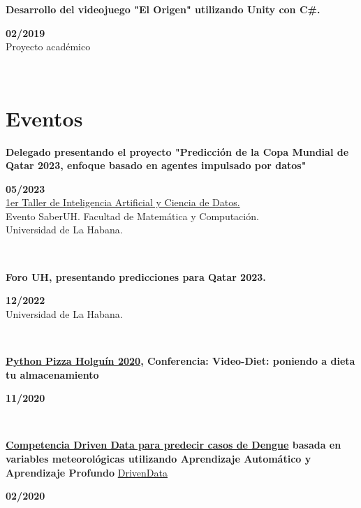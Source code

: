 \documentclass{article}
\begin{document}
    \begin{minipage}{0.8\textwidth}
    \parbox{0.8\linewidth}{\textbf{Desarrollo del videojuego "El Origen" utilizando Unity con C\#.}} \hfill \textbf{02/2019}\\
    Proyecto académico\\
    \end{minipage} \\

\section*{Eventos}

\begin{minipage}{0.8\textwidth}
\parbox{0.8\linewidth}{\textbf{Delegado presentando el proyecto "Predicción de la Copa Mundial de Qatar 2023, enfoque basado en agentes impulsado por datos"}} \hfill \textbf{05/2023}\\
\hyperref[sec:workshop]{1er Taller de Inteligencia Artificial y Ciencia de Datos.} \\
Evento SaberUH. Facultad de Matemática y Computación. \\
Universidad de La Habana.\\
\end{minipage} \\
\begin{minipage}{0.8\textwidth}
\parbox{0.8\linewidth}{\textbf{Foro UH, presentando predicciones para Qatar 2023.}} \hfill \textbf{12/2022}\\
Universidad de La Habana.\\
\end{minipage}\\
\begin{minipage}{0.8\textwidth}
\parbox{0.8\linewidth}{\textbf{\hyperref[sec:pythonpizza]{Python Pizza Holguín 2020}, Conferencia: Video-Diet: poniendo a dieta tu almacenamiento}} \hfill \textbf{11/2020}\\
\end{minipage} \\
\begin{minipage}{0.8\textwidth}
\parbox{0.8\linewidth}{\textbf{\hyperref[sec:dengue]{Competencia Driven Data para predecir casos de Dengue} basada en variables meteorológicas utilizando Aprendizaje Automático y Aprendizaje Profundo} \href{https://www.drivendata.org/competitions/44/dengai-predicting-disease-spread}{DrivenData}} \hfill \textbf{02/2020}\\
\\
\end{minipage} \hfill {}\\
\end{document}

